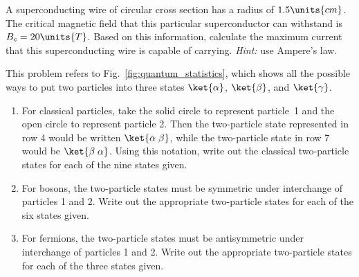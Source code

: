 \begin{problem}
A superconducting wire of circular cross section has a radius of
$1.5\units{cm}$.  The critical magnetic field that this particular
superconductor can withstand is $B_c=20\units{T}$.  Based on this
information, calculate the maximum current that this superconducting
wire is capable of carrying.  \textit{Hint:} use Ampere's law.
\end{problem}


\begin{problem}
This problem refers to Fig.~\ref{fig:quantum_statistics}, which shows
all the possible ways to put two particles into three states $\ket{\alpha}$,
$\ket{\beta}$, and $\ket{\gamma}$.
\begin{enumerate}
\item For classical particles, take the solid circle to represent
  particle~1 and the open circle to represent particle 2.  Then the
  two-particle state represented in row 4 would be written
  $\ket{\alpha\;\beta}$, while the two-particle state in row 7 would
  be $\ket{\beta\; \alpha}$.  Using this notation, write out 
  the classical two-particle states for each of the nine states given.

\item For  bosons, the two-particle states must be symmetric under
interchange of particles 1 and 2.  Write out the appropriate two-particle
states for each of the six states given.

\item For fermions, the two-particle states must be antisymmetric under
interchange of particles 1 and 2.  Write out the appropriate two-particle
states for each of the three states given.


\end{enumerate}
\end{problem}

%



